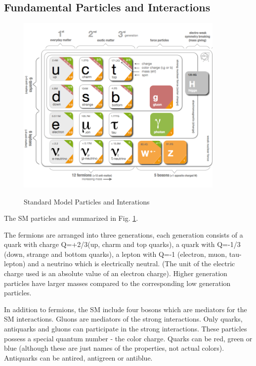 \subsection{Fundamental Particles and Interactions}
\label{sec:Intro_FundParticles}

\begin{figure}[htb]
  \begin{center}
    {\includegraphics[width=0.90\textwidth]{../figs/Intro/StandardModel.png}}
    \caption{Standard Model Particles and Interations}
    \label{fig:SMtable}
  \end{center}
\end{figure}

The SM particles and summarized in Fig. \ref{fig:SMtable}. 

The fermions are arranged into three generations, each generation consists of a quark with charge Q=+2/3(up, charm and top quarks), a quark with Q=-1/3 (down, strange and bottom quarks), a lepton with Q=-1 (electron, muon, tau-lepton) and a neutrino which is electrically neutral. (The unit of the electric charge used is an absolute value of an electron charge). Higher generation particles have larger masses compared to the corresponding low generation particles. 

In addition to fermions, the SM include four bosons which are mediators for the SM interactions. Gluons are mediators of the strong interactions. Only quarks, antiquarks and gluons can participate in the strong interactions. These particles possess a special quantum number - the color charge. Quarks can be red, green or blue (although these are just names of the properties, not actual colors). Antiquarks can be antired, antigreen or antiblue. 

